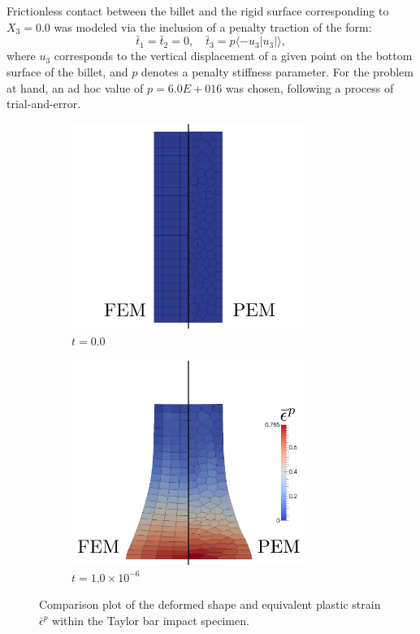 Frictionless contact between the billet and the rigid surface corresponding to $X_3 = 0.0$ was modeled via the inclusion of a penalty traction of the form:
\begin{equation}
	\bar{t}_1 = \bar{t}_2 = 0, \quad \bar{t}_3 = p \langle -u_3|u_3|  \rangle,
\end{equation}
where $u_3$ corresponds to the vertical displacement of a given point on the bottom surface of the billet, and $p$ denotes a penalty stiffness parameter. For the problem at hand, an ad hoc value of $p = 6.0E+016$ was chosen, following a process of trial-and-error.

\begin{figure}[!h]
  \centering
    \begin{subfigure}[b]{0.49\linewidth}
            \centering
            \includegraphics[width=3.0in]{figures/taylor_eqps_0.pdf}
    			\caption{$t=0.0$ \label{fig:taylor_eqps_0}}
    \end{subfigure}
	\begin{subfigure}[b]{0.49\linewidth}
            \centering
            \includegraphics[width=3.0in]{figures/taylor_eqps_1.pdf}
    			\caption{$t=1.0\times 10^{-6}$ \label{fig:taylor_eqps_1}}
    \end{subfigure} \caption{Comparison plot of the deformed shape and equivalent plastic strain $\bar{\epsilon}^p$ within the Taylor bar impact specimen.}
  \label{fig:taylor_eqps}
\end{figure}

